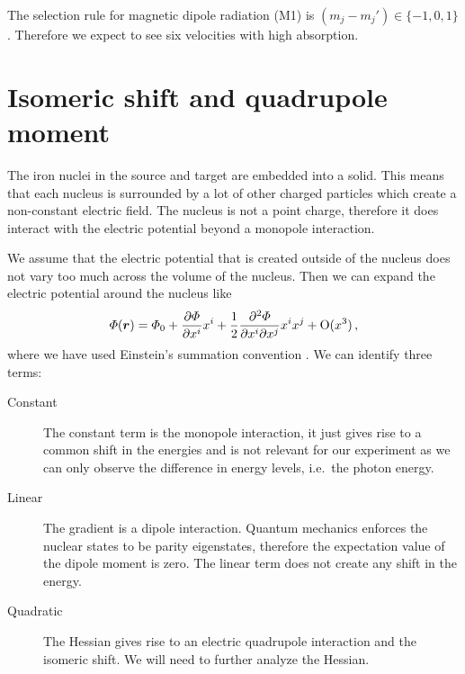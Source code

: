 \documentclass[11pt, english, fleqn, DIV=15, headinclude, BCOR=2cm]{scrreprt}
\begin{document}
The selection rule for magnetic dipole radiation (M1) is $(m_j - m_j') \in \{
-1, 0, 1 \}$. Therefore we expect to see six velocities with high absorption.

\section{Isomeric shift and quadrupole moment}

The iron nuclei in the source and target are embedded into a solid. This means
that each nucleus is surrounded by a lot of other charged particles which
create a non-constant electric field. The nucleus is not a point charge,
therefore it does interact with the electric potential beyond a monopole
interaction.

We assume that the electric potential that is created outside of the nucleus
does not vary too much across the volume of the nucleus. Then we can expand the
electric potential around the nucleus like
\[
    \Phi(\vec r) = \Phi_0 + \pd{\Phi}{x^i} x^i
    + \frac12 \frac{\partial^2 \Phi}{\partial x^i \partial x^j} x^i x^j +
    \mathrm O(x^3) \,,
\]
where we have used Einstein's summation convention
\parencite[(3.19)]{Schatz/Nukleare_Festkoerperphysik}. We can identify three
terms:

\begin{description}
    \item[Constant]
        The constant term is the monopole interaction, it just gives rise to a
        common shift in the energies and is not relevant for our experiment as
        we can only observe the difference in energy levels, i.e.\ the photon
        energy.

    \item[Linear]
        The gradient is a dipole interaction. Quantum mechanics enforces the
        nuclear states to be parity eigenstates, therefore the expectation
        value of the dipole moment is zero. The linear term does not create any
        shift in the energy.

    \item[Quadratic]
        The Hessian gives rise to an electric quadrupole interaction and the
        isomeric shift. We will need to further analyze the Hessian.
\end{description}
\end{document}
